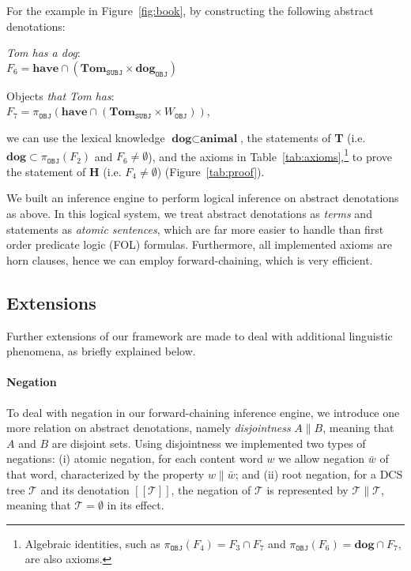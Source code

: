 \documentclass[11pt]{article}
\def\den#1{[\![#1]\!]}
\begin{document}
For the example in Figure~\ref{fig:book}, by constructing the following abstract denotations: 

\vspace{4pt}
\noindent \emph{Tom has a dog}: \\
\indent\quad $F_6=\textbf{have}\cap(\textbf{Tom}_{\texttt{SUBJ}}\times\textbf{dog}_{\texttt{OBJ}})$

\noindent Objects \emph{that Tom has}: \\
\indent\quad $F_7=\pi_{\texttt{OBJ}}(\textbf{have}\cap(\textbf{Tom}_{\texttt{SUBJ}}\times W_{\texttt{OBJ}}))$, 
\vspace{4pt}

\noindent we can use the lexical knowledge 
$\textbf{dog}\subset\textbf{animal}$, the statements of {\bf T} 
(i.e. $\textbf{dog}\subset\pi_{\texttt{OBJ}}(F_2)$ and $F_6\neq\emptyset$), and the axioms in 
Table~\ref{tab:axioms},\footnote{Algebraic identities, such as $\pi_{\texttt{OBJ}}(F_4)=F_3\cap F_7$ 
and $\pi_{\texttt{OBJ}}(F_6)=\textbf{dog}\cap F_7$, are also axioms.} 
to prove the statement of {\bf H} (i.e. $F_4\ne\emptyset$) (Figure~\ref{tab:proof}). 

We built an inference engine to perform logical inference on abstract denotations 
as above. In this logical system, we treat abstract denotations as \emph{terms} and 
statements as \emph{atomic sentences}, which are far more easier to handle than 
first order predicate logic (FOL) formulas. Furthermore, all implemented axioms are 
horn clauses, hence we can employ forward-chaining, which is very efficient. 

\subsection{Extensions}
\label{sec:extensions}

Further extensions of our framework are made to deal with additional linguistic 
phenomena, as briefly explained below.

\paragraph{Negation} 
To deal with negation in our forward-chaining inference engine, we introduce 
one more relation on abstract denotations, namely \emph{disjointness} 
$A\parallel B$, meaning that $A$ and $B$ are disjoint sets. Using disjointness 
we implemented two types of negations: (i) atomic negation, for each content word $w$ 
we allow negation $\bar{w}$ of that word,
characterized by the property $w\parallel\bar{w}$; and (ii)
root negation, for a DCS tree $\mathcal{T}$ and its denotation $\den{\mathcal{T}}$, 
the negation of $\mathcal{T}$ is represented by $\mathcal{T}\parallel\mathcal{T}$, 
meaning that $\mathcal{T}=\emptyset$ in its effect. 
\end{document}
